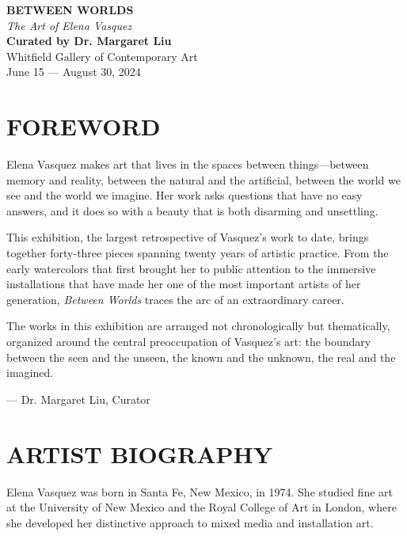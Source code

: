 \documentclass[
    language=english,
    doctype=art-catalogue,
    institution=none,
]{../../omnilatex}
\begin{document}
\maketitle

\vspace{1cm}

\begin{center}
\textbf{BETWEEN WORLDS}\\[0.3cm]
\textit{The Art of Elena Vasquez}\\[0.5cm]
\textbf{Curated by Dr. Margaret Liu}\\[0.3cm]
Whitfield Gallery of Contemporary Art\\
June 15 --- August 30, 2024
\end{center}

\vspace{1cm}

\section*{FOREWORD}

Elena Vasquez makes art that lives in the spaces between things---between memory and reality, between the natural and the artificial, between the world we see and the world we imagine. Her work asks questions that have no easy answers, and it does so with a beauty that is both disarming and unsettling.

This exhibition, the largest retrospective of Vasquez's work to date, brings together forty-three pieces spanning twenty years of artistic practice. From the early watercolors that first brought her to public attention to the immersive installations that have made her one of the most important artists of her generation, \textit{Between Worlds} traces the arc of an extraordinary career.

The works in this exhibition are arranged not chronologically but thematically, organized around the central preoccupation of Vasquez's art: the boundary between the seen and the unseen, the known and the unknown, the real and the imagined.

--- Dr. Margaret Liu, Curator

\section*{ARTIST BIOGRAPHY}

Elena Vasquez was born in Santa Fe, New Mexico, in 1974. She studied fine art at the University of New Mexico and the Royal College of Art in London, where she developed her distinctive approach to mixed media and installation art.
\end{document}

